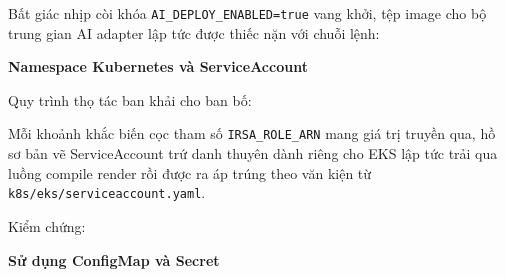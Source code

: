 Bất giác nhịp còi khóa \texttt{AI\_\allowbreak{}DEPLOY\_\allowbreak{}ENABLED=true} vang khởi, tệp
image cho bộ trung gian AI adapter lập tức được thiếc nặn với chuỗi
lệnh:

\begin{Shaded}
\begin{Highlighting}[]
 \OperatorTok{\textless{}}\OperatorTok{\textgreater{}}
\OperatorTok{\textless{}}\OperatorTok{\textgreater{}}
\end{Highlighting}
\end{Shaded}

\vspace{0.5em}\noindent\textbf{Namespace Kubernetes và
ServiceAccount}\par

Quy trình thọ tác ban khải cho ban bố:

\begin{Shaded}
\begin{Highlighting}[]
\end{Highlighting}
\end{Shaded}

Mỗi khoảnh khắc biến cọc tham số \texttt{IRSA\_\allowbreak{}ROLE\_\allowbreak{}ARN} mang giá trị
truyền qua, hồ sơ bản vẽ ServiceAccount trứ danh thuyên dành riêng cho
EKS lập tức trải qua luồng compile render rồi được ra áp trúng theo văn
kiện từ \texttt{k8s/\allowbreak{}eks/\allowbreak{}serviceaccount.\allowbreak{}yaml}.

Kiểm chứng:

\begin{Shaded}
\begin{Highlighting}[]
\end{Highlighting}
\end{Shaded}

\vspace{0.5em}\noindent\textbf{Sử dụng ConfigMap và
Secret}\par

